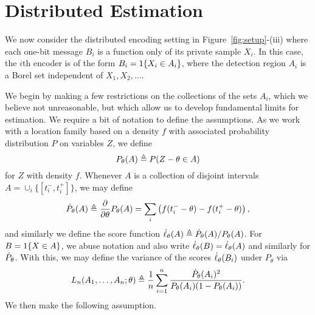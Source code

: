 \section{Distributed Estimation \label{sec:distributed}}

We now consider the distributed encoding setting in
Figure~\ref{fig:setup}-(iii) where each one-bit message $B_i$ is a
function only of its private sample $X_i$. In this case, the $i$th encoder is
of the form $B_i = 1\!\left\{X_i \in A_i\right\}$, where the detection region
$A_i$ is a Borel set independent of $X_1, X_2, \ldots$.

We begin by making a few restrictions on the collections of the sets $A_i$,
which we believe not unreasonable, but which allow us to develop fundamental
limits for estimation.  We require a bit of notation to define the
assumptions. As we work with a location family based on a density $f$
with associated probability distribution $P$ on variables $Z$,
we define
\begin{equation*}
  P_\theta(A) \triangleq P(Z - \theta \in A)
\end{equation*}
for $Z$ with density $f$. Whenever $A$ is a collection
of disjoint intervals $A = \cup_i \{[t_i^-, t_i^+]\}$, we may define
\begin{equation*}
  \dot{P}_\theta(A) \triangleq \frac{\partial}{\partial \theta} P_\theta(A)
  = \sum_i \left(f(t_i^- - \theta) - f(t_i^+ - \theta)\right),
\end{equation*}
and similarly we define the score
function $\dot{\ell}_\theta(A) \triangleq \dot{P}_\theta(A) / P_\theta(A)$.
For $B = 1\!\left\{X \in A\right\}$, we abuse notation and also write
$\dot{\ell}_\theta(B) = \dot{\ell}_\theta(A)$ and similarly for $\dot{P}_\theta$.
With this, we may define the variance of the
scores $\dot{\ell}_\theta(B_i)$ under $P_\theta$ via
\begin{equation}
  \label{eq:precision_general}
  L_n(A_1,\ldots,A_n;\theta) \triangleq
  \frac{1}{n} \sum_{i=1}^n \frac{ \dot{P}_\theta(A_i)^2}{
    P_\theta(A_i) (1 - P_\theta(A_i))}.
\end{equation}
We then make the following assumption.
